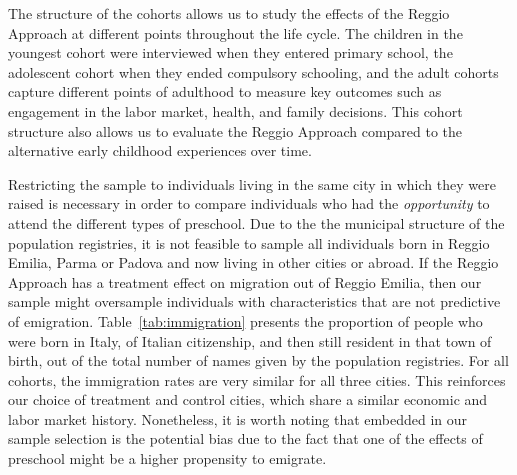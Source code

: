 \begin{table}[H]
\centering
{}
\end{table}

The structure of the cohorts allows us to study the effects of the Reggio Approach at different points throughout the life cycle. The children in the youngest cohort were interviewed when they entered primary school, the adolescent cohort when they ended compulsory schooling, and the adult cohorts capture different points of adulthood to measure key outcomes such as engagement in the labor market, health, and family decisions. This cohort structure also allows us to evaluate the Reggio Approach compared to the alternative early childhood experiences over time.

Restricting the sample to individuals living in the same city in which they were raised is necessary in order to compare individuals who had the \textit{opportunity} to attend the different types of preschool. Due to the the municipal structure of the population registries, it is not feasible to sample all individuals born in Reggio Emilia, Parma or Padova and now living in other cities or abroad. If the Reggio Approach has a treatment effect on migration out of Reggio Emilia, then our sample might oversample individuals with characteristics that are not predictive of emigration. Table~\ref{tab:immigration} presents the proportion of people who were born in Italy, of Italian citizenship, and then still resident in that town of birth, out of the total number of names given by the population registries. For all cohorts, the immigration rates are very similar for all three cities. This reinforces our choice of treatment and control cities, which share a similar economic and labor market history. Nonetheless, it is worth noting that embedded in our sample selection is the potential bias due to the fact that one of the effects of preschool might be a higher propensity to emigrate. 

